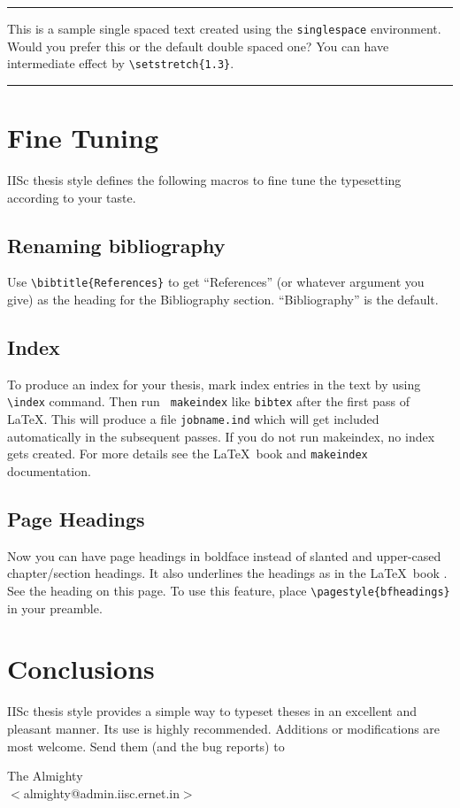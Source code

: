 \bigskip
\hrule
\begin{singlespace}
	This is a   sample single    spaced text  created  using   the
\verb|singlespace| environment.  Would you prefer this or
the default double spaced one? You can have intermediate effect by
\verb|\setstretch{1.3}|.
\end{singlespace}

\medskip
\hrule
\bigskip


\chapter{Fine Tuning}

	IISc thesis  style defines the following  macros  to fine  tune the
typesetting according to your taste.

\section{Renaming bibliography}
	Use  \verb|\bibtitle{References}| to   get ``References''   (or
whatever  argument  you  give)  as the  heading  for the  Bibliography
section. ``Bibliography'' is the default.

\section{Index}
	To produce  an index for  your thesis,  mark   index
entries in  the text by  using  \verb|\index| command.  Then run  {\tt
makeindex} like {\tt bibtex} after the first pass of \LaTeX. This will
produce a file {\tt jobname.ind} which will get included automatically
in the subsequent passes.  If you do not run makeindex,  no index gets
created.  For more details see the \LaTeX\ book \cite{latex}and  {\tt makeindex}
documentation.

\section{Page Headings}
	Now you can     have page  headings  in
boldface instead of slanted  and upper-cased chapter/section headings.  It
also underlines the headings as  in the \LaTeX\ book \cite{latex}.  See the heading
on  this  page. To use  this feature, place \verb|\pagestyle{bfheadings}| in your
preamble.

\chapter{Conclusions}
  IISc thesis style provides a simple way to typeset 
theses in an excellent and pleasant manner. Its use is highly recommended. 
Additions or modifications are most welcome. Send them (and the bug reports) to 
\begin{center}
The Almighty\\
$<$almighty@admin.iisc.ernet.in$>$
\end{center}

